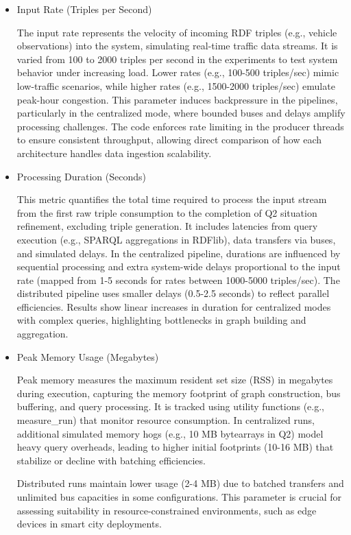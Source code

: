 \documentclass[5p,times]{elsarticle}
\begin{document}
\begin{itemize}
    \item Input Rate (Triples per Second)
    
    The input rate represents the velocity of incoming RDF triples (e.g., vehicle observations) into the system, simulating real-time traffic data streams. It is varied from 100 to 2000 triples per second in the experiments to test system behavior under increasing load. Lower rates (e.g., 100-500 triples/sec) mimic low-traffic scenarios, while higher rates (e.g., 1500-2000 triples/sec) emulate peak-hour congestion. This parameter induces backpressure in the pipelines, particularly in the centralized mode, where bounded buses and delays amplify processing challenges. The code enforces rate limiting in the producer threads to ensure consistent throughput, allowing direct comparison of how each architecture handles data ingestion scalability.

    \item Processing Duration (Seconds)
    
    This metric quantifies the total time required to process the input stream from the first raw triple consumption to the completion of Q2 situation refinement, excluding triple generation. It includes latencies from query execution (e.g., SPARQL aggregations in RDFlib), data transfers via buses, and simulated delays. In the centralized pipeline, durations are influenced by sequential processing and extra system-wide delays proportional to the input rate (mapped from 1-5 seconds for rates between 1000-5000 triples/sec). The distributed pipeline uses smaller delays (0.5-2.5 seconds) to reflect parallel efficiencies. Results show linear increases in duration for centralized modes with complex queries, highlighting bottlenecks in graph building and aggregation.

    \item Peak Memory Usage (Megabytes)
    
    Peak memory measures the maximum resident set size (RSS) 
    in megabytes during execution, capturing the memory footprint
     of graph construction, bus buffering, and query processing.
     It is tracked using utility functions (e.g., measure\_run) 
     that monitor resource consumption. In centralized runs, additional simulated memory hogs (e.g., 10 MB bytearrays in Q2) model heavy query overheads, leading to higher initial footprints (10-16 MB) that stabilize or decline with batching efficiencies. 
     
     Distributed runs maintain lower usage (2-4 MB) due to batched transfers and unlimited bus capacities in some configurations. This parameter is crucial for assessing suitability in resource-constrained environments, such as edge devices in smart city deployments.


\end{itemize}
\end{document}
